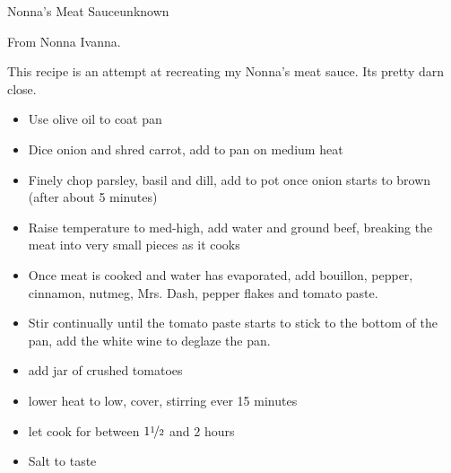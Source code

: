 \begin{recipe}{Nonna's Meat Sauce}{unknown}{}

    \freeform From Nonna Ivanna.


    This recipe is an attempt at recreating my Nonna's meat sauce. Its pretty darn close.

    \begin{itemize}
        \item Use olive oil to coat pan
        \item Dice onion and shred carrot, add to pan on medium heat
        \item Finely chop parsley, basil and dill, add to pot once onion starts to brown (after about 5 minutes)
        \item Raise temperature to med-high, add water and ground beef, breaking the meat into very small pieces as it cooks
        \item Once meat is cooked and water has evaporated, add bouillon, pepper, cinnamon, nutmeg, Mrs. Dash, pepper flakes and tomato paste.
        \item Stir continually until the tomato paste starts to stick to the bottom of the pan, add the white wine to deglaze the pan.
        \item add jar of crushed tomatoes
        \item lower heat to low, cover, stirring ever 15 minutes
        \item let cook for between $1\nicefrac{1}{2}$ and $2$ hours
        \item Salt to taste
    \end{itemize}
\end{recipe}